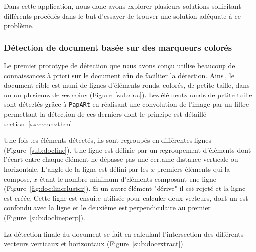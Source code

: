 Dans cette application, nous donc avons explorer plusieurs solutions sollicitant différents procédés dans le but d'essayer de trouver une solution adéquate à ce problème.

\subsubsection{Détection de document basée sur des marqueurs colorés} Le premier prototype de détection que nous avons conçu utilise beaucoup de connaissances à priori sur le document afin de faciliter la détection. Ainsi, le document cible est muni de lignes d'éléments ronds, colorés, de petite taille, dans un ou plusieurs de ses coins (Figure~\ref{sub:doc}). Les éléments ronds de petite taille sont détectés grâce à \texttt{PapARt} en réalisant une convolution de l'image par un filtre permettant la détection de ces derniers dont le principe est détaillé section~\ref{ssec:convtheo}.

Une fois les éléments détectés, ils sont regroupés en différentes lignes (Figure~\ref{sub:docline}).
Une ligne est définie par un regroupement d'éléments dont l'écart entre chaque élément ne dépasse pas une certaine distance verticale ou horizontale. L'angle de la ligne est défini par les $x$ premiers éléments qui la compose, $x$ étant le nombre minimum d'éléments composant une ligne (Figure~\ref{fig:doc:linecluster}). Si un autre élément "dérive" il est rejeté et la ligne est créée. Cette ligne est ensuite utilisée pour calculer deux vecteurs, dont un est confondu avec la ligne et le deuxième est perpendiculaire au premier (Figure~\ref{sub:doclineperp}).

La détection finale du document se fait en calculant l'intersection des différents vecteurs verticaux et horizontaux (Figure~\ref{sub:docextract})

